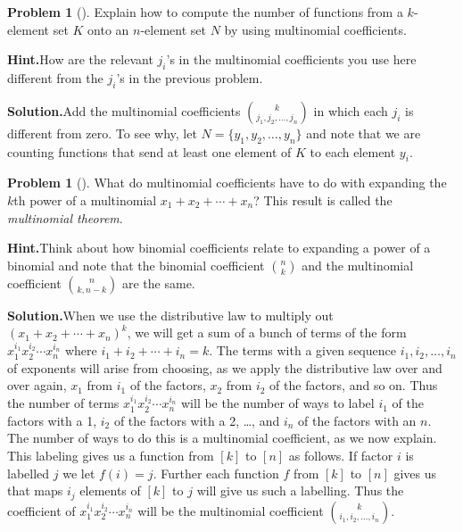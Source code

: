 \documentclass[10pt,]{book}
\theoremstyle{plain}
\theoremstyle{definition}
\newtheorem{activity}[project]{Problem}
\theoremstyle{definition}
\numberwithin{equation}{chapter}
\begin{document}
\begin{activity}[]\label{activity-150}
Explain how to compute the number of functions from a \(k\)-element set \(K\) onto an \(n\)-element set \(N\) by using multinomial coefficients.%
\par\medskip\noindent%
\textbf{Hint.}\quad How are the relevant \(j_i\)'s in the multinomial coefficients you use here different from the \(j_i\)'s in the previous problem.%
\par\medskip\noindent%
\textbf{Solution.}\quad Add the multinomial coefficients \(\binom{k}{j_1,j_2,\ldots,j_n}\) in which each \(j_i\) is different from zero. To see why, let \(N=\{y_1,y_2,\ldots,y_n\}\) and note that we are counting functions that send at least one element of \(K\) to each element \(y_i\).%
\end{activity}
\begin{activity}[]\label{activity-151}
What do multinomial coefficients have to do with expanding the \(k\)th power of a multinomial \(x_1+x_2+\cdots+x_n\)? This result is called the \emph{multinomial theorem}.%
\par\medskip\noindent%
\textbf{Hint.}\quad Think about how binomial coefficients relate to expanding a power of a binomial and note that the binomial coefficient \(\binom{n}{k}\) and the multinomial coefficient \(\binom{n}{k,n-k}\) are the same.%
\par\medskip\noindent%
\textbf{Solution.}\quad When we use the distributive law to multiply out \((x_1+x_2+\cdots +x_n)^k\), we will get a sum of a bunch of terms of the form \(x_1^{i_1}x_2^{i_2}\cdots x_n^{i_n}\) where \(i_1+i_2+\cdots+ i_n=k\).  The terms with a given sequence \(i_1,i_2,\ldots, i_n\) of exponents will arise from choosing, as we apply the distributive law over and over again, \(x_1\) from \(i_1\) of the factors, \(x_2\) from \(i_2\) of the factors, and so on. Thus the number of terms \(x_1^{i_1}x_2^{i_2}\cdots x_n^{i_n}\) will be the number of ways to label \(i_1\) of the factors with a 1, \(i_2\) of the factors with a 2, \dots{}, and \(i_n\) of the factors with an \(n\). The number of ways to do this is a multinomial coefficient, as we now explain. This labeling gives us a function from \([k]\) to \([n]\) as follows. If factor \(i\) is labelled \(j\) we let \(f(i) =j\). Further each function \(f\) from \([k]\) to \([n]\) gives us that maps \(i_j\) elements of \([k]\) to \(j\) will give us such a labelling. Thus the coefficient of \(x_1^{i_1}x_2^{i_2}\cdots x_n^{i_n}\) will be the multinomial coefficient \(\binom{k}{i_1,i_2,\ldots, i_n}\).%
\end{activity}
\typeout{************************************************}
\typeout{************************************************}
\end{document}
